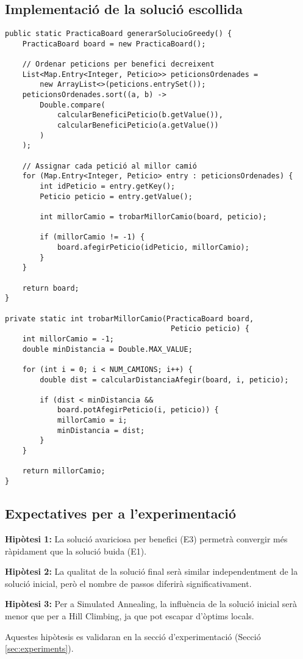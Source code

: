 \subsection{Implementació de la solució escollida}

\begin{lstlisting}[caption={Implementació de la solució avariciosa per benefici}, label={lst:greedy-impl}]
public static PracticaBoard generarSolucioGreedy() {
    PracticaBoard board = new PracticaBoard();
    
    // Ordenar peticions per benefici decreixent
    List<Map.Entry<Integer, Peticio>> peticionsOrdenades = 
        new ArrayList<>(peticions.entrySet());
    peticionsOrdenades.sort((a, b) -> 
        Double.compare(
            calcularBeneficiPeticio(b.getValue()),
            calcularBeneficiPeticio(a.getValue())
        )
    );
    
    // Assignar cada petició al millor camió
    for (Map.Entry<Integer, Peticio> entry : peticionsOrdenades) {
        int idPeticio = entry.getKey();
        Peticio peticio = entry.getValue();
        
        int millorCamio = trobarMillorCamio(board, peticio);
        
        if (millorCamio != -1) {
            board.afegirPeticio(idPeticio, millorCamio);
        }
    }
    
    return board;
}

private static int trobarMillorCamio(PracticaBoard board, 
                                      Peticio peticio) {
    int millorCamio = -1;
    double minDistancia = Double.MAX_VALUE;
    
    for (int i = 0; i < NUM_CAMIONS; i++) {
        double dist = calcularDistanciaAfegir(board, i, peticio);
        
        if (dist < minDistancia && 
            board.potAfegirPeticio(i, peticio)) {
            millorCamio = i;
            minDistancia = dist;
        }
    }
    
    return millorCamio;
}
\end{lstlisting}

\subsection{Expectatives per a l'experimentació}

\textbf{Hipòtesi 1:} La solució avariciosa per benefici (E3) permetrà convergir més ràpidament que la solució buida (E1).

\textbf{Hipòtesi 2:} La qualitat de la solució final serà similar independentment de la solució inicial, però el nombre de passos diferirà significativament.

\textbf{Hipòtesi 3:} Per a Simulated Annealing, la influència de la solució inicial serà menor que per a Hill Climbing, ja que pot escapar d'òptims locals.

Aquestes hipòtesis es validaran en la secció d'experimentació (Secció \ref{sec:experiments}).